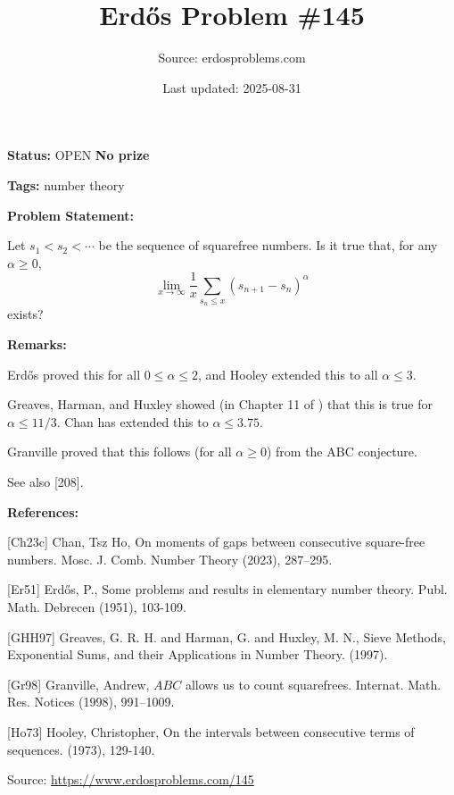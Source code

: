 \documentclass{article}
\title{Erd\H{o}s Problem \#145}
\date{Last updated: 2025-08-31}
\author{Source: erdosproblems.com}
\begin{document}
\maketitle

\noindent\textbf{Status:} OPEN \quad \textbf{No prize}

\noindent\textbf{Tags:} number theory

\medskip
\noindent\textbf{Problem Statement:}

Let $s_1<s_2<\cdots$ be the sequence of squarefree numbers. Is it true that, for any $\alpha \geq 0$,\[\lim_{x\to \infty}\frac{1}{x}\sum_{s_n\leq x}(s_{n+1}-s_n)^\alpha\]exists?

\bigskip
\noindent\textbf{Remarks:}

Erd\H{o}s \cite{Er51} proved this for all $0\leq \alpha \leq 2$, and Hooley \cite{Ho73} extended this to all $\alpha \leq 3$. 

Greaves, Harman, and Huxley showed (in Chapter 11 of \cite{GHH97}) that this is true for $\alpha \leq 11/3$. Chan \cite{Ch23c} has extended this to $\alpha \leq 3.75$.

Granville \cite{Gr98} proved that this follows (for all $\alpha \geq 0$) from the ABC conjecture.

See also [208].

\bigskip
\noindent\textbf{References:}

[Ch23c] Chan, Tsz Ho, On moments of gaps between consecutive square-free numbers. Mosc. J. Comb. Number Theory (2023), 287--295.
 
 [Er51] Erd\H{o}s, P., Some problems and results in elementary number theory. Publ. Math. Debrecen (1951), 103-109.
 
 [GHH97] Greaves, G. R. H. and Harman, G. and Huxley, M. N., Sieve Methods, Exponential Sums, and their Applications in Number Theory. (1997).
 
 [Gr98] Granville, Andrew, {$ABC$} allows us to count squarefrees. Internat. Math. Res. Notices (1998), 991--1009.
 
 [Ho73] Hooley, Christopher, On the intervals between consecutive terms of sequences. (1973), 129-140.

\bigskip
\noindent\small{Source: \url{https://www.erdosproblems.com/145}}
\end{document}
